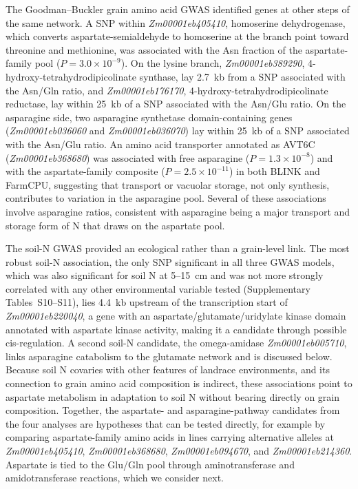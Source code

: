 The Goodman--Buckler grain amino acid GWAS identified genes at other steps of the same network. A SNP within \textit{Zm00001eb405410}, homoserine dehydrogenase, which converts aspartate-semialdehyde to homoserine at the branch point toward threonine and methionine, was associated with the Asn fraction of the aspartate-family pool ($P = 3.0 \times 10^{-9}$). On the lysine branch, \textit{Zm00001eb389290}, 4-hydroxy-tetrahydrodipicolinate synthase, lay 2.7~kb from a SNP associated with the Asn/Gln ratio, and \textit{Zm00001eb176170}, 4-hydroxy-tetrahydrodipicolinate reductase, lay within 25~kb of a SNP associated with the Asn/Glu ratio. On the asparagine side, two asparagine synthetase domain-containing genes (\textit{Zm00001eb036060} and \textit{Zm00001eb036070}) lay within 25~kb of a SNP associated with the Asn/Glu ratio. An amino acid transporter annotated as AVT6C (\textit{Zm00001eb368680}) was associated with free asparagine ($P = 1.3 \times 10^{-8}$) and with the aspartate-family composite ($P = 2.5 \times 10^{-11}$) in both BLINK and FarmCPU, suggesting that transport or vacuolar storage, not only synthesis, contributes to variation in the asparagine pool. Several of these associations involve asparagine ratios, consistent with asparagine being a major transport and storage form of N that draws on the aspartate pool.

The soil-N GWAS provided an ecological rather than a grain-level link. The most robust soil-N association, the only SNP significant in all three GWAS models, which was also significant for soil N at 5--15~cm and was not more strongly correlated with any other environmental variable tested (Supplementary Tables~S10--S11), lies 4.4~kb upstream of the transcription start of \textit{Zm00001eb220040}, a gene with an aspartate/glutamate/uridylate kinase domain annotated with aspartate kinase activity, making it a candidate through possible cis-regulation. A second soil-N candidate, the omega-amidase \textit{Zm00001eb005710}, links asparagine catabolism to the glutamate network and is discussed below. Because soil N covaries with other features of landrace environments, and its connection to grain amino acid composition is indirect, these associations point to aspartate metabolism in adaptation to soil N without bearing directly on grain composition. Together, the aspartate- and asparagine-pathway candidates from the four analyses are hypotheses that can be tested directly, for example by comparing aspartate-family amino acids in lines carrying alternative alleles at \textit{Zm00001eb405410}, \textit{Zm00001eb368680}, \textit{Zm00001eb094670}, and \textit{Zm00001eb214360}. Aspartate is tied to the Glu/Gln pool through aminotransferase and amidotransferase reactions, which we consider next.


